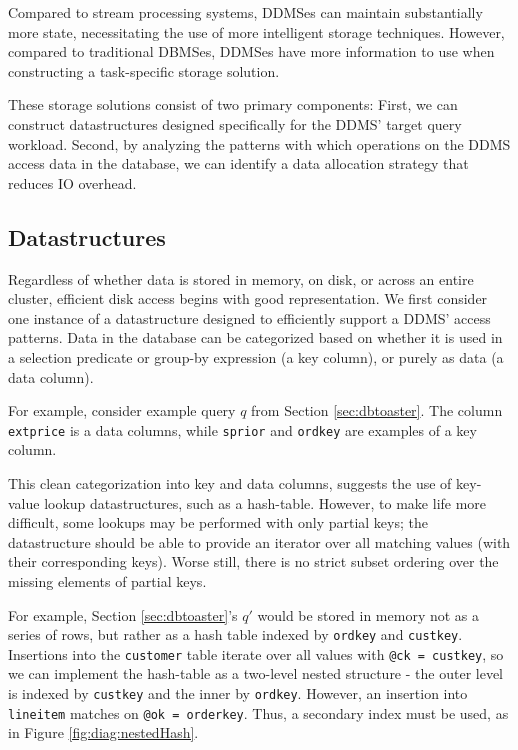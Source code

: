 Compared to stream processing systems, DDMSes can maintain substantially more state, necessitating the use of more intelligent storage techniques.  However, compared to traditional DBMSes, DDMSes have more information to use when constructing a task-specific storage solution.  

These storage solutions consist of two primary components: First, we can construct datastructures designed specifically for the DDMS' target query workload.  Second, by analyzing the patterns with which operations on the DDMS access data in the database, we can identify a data allocation strategy that reduces IO overhead.

\subsection{Datastructures}
Regardless of whether data is stored in memory, on disk, or across an entire cluster, efficient disk access begins with good representation.  We first consider one instance of a datastructure designed to efficiently support a DDMS' access patterns.  Data in the database can be categorized based on whether it is used in a selection predicate or group-by expression (a key column), or purely as data (a data column).  

For example, consider example query $q$ from Section \ref{sec:dbtoaster}.  The column \texttt{extprice} is a data columns, while \texttt{sprior} and \texttt{ordkey} are examples of a key column.  

This clean categorization into key and data columns, suggests the use of key-value lookup datastructures, such as a hash-table.  However, to make life more difficult, some lookups may be performed with only partial keys; the datastructure should be able to provide an iterator over all matching values (with their corresponding keys).  Worse still, there is no strict subset ordering over the missing elements of partial keys.

For example, Section \ref{sec:dbtoaster}'s $q'$ would be stored in memory not as a series of rows, but rather as a hash table indexed by \texttt{ordkey} and \texttt{custkey}.  Insertions into the \texttt{customer} table iterate over all values with \texttt{@ck = custkey}, so we can implement the hash-table as a two-level nested structure - the outer level is indexed by \texttt{custkey} and the inner by \texttt{ordkey}.  However, an insertion into \texttt{lineitem} matches on \texttt{@ok = orderkey}.  Thus, a secondary index must be used, as in Figure \ref{fig:diag:nestedHash}.

